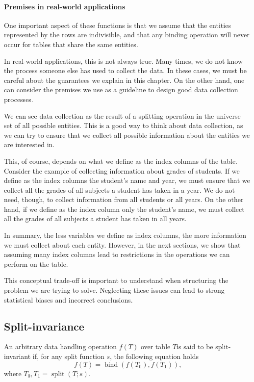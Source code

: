 \paragraph{Premises in real-world applications}

One important aspect of these functions is that we assume that the entities represented by
the rows are indivisible, and that any binding operation will never occur for tables that
share the same entities.

In real-world applications, this is not always true.  Many times, we do not know the
process someone else has used to collect the data.  In these cases, we must be careful
about the guarantees we explain in this chapter.  On the other hand, one can consider the
premises we use as a guideline to design good data collection processes.

We can see data collection as the result of a splitting operation in the universe set of
all possible entities.  This is a good way to think about data collection, as we can try
to ensure that we collect all possible information about the entities we are interested
in.

This, of course, depends on what we define as the index columns of the table.  Consider
the example of collecting information about grades of students.  If we define as the index
columns the student's name and year, we must ensure that we collect all the grades of all
subjects a student has taken in a year.  We do not need, though, to collect information
from all students or all years.  On the other hand, if we define as the index column only
the student's name, we must collect all the grades of all subjects a student has taken in
all years.

In summary, the less variables we define as index columns, the more information we must
collect about each entity.  However, in the next sections, we show that assuming many index columns
lead to restrictions in the operations we can perform on the table.

This conceptual trade-off is important to understand when structuring the problem we are
trying to solve.  Neglecting these issues can lead to strong statistical biases and
incorrect conclusions.

\subsection{Split-invariance}

An arbitrary data handling operation $f(T)$ over table $T$is said to be split-invariant
if, for any split function $s$, the following equation holds \[
  f\!\left(T\right) =
    \operatorname{bind}\!\left(f\!\left(T_0\right), f\!\left(T_1\right)\right)\text{,}
\] where $T_0, T_1 = \operatorname{split}\!\left(T; s\right)$.

